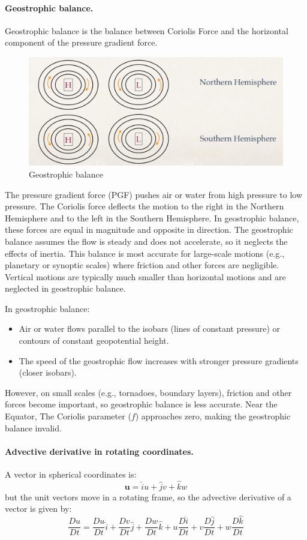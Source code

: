 \paragraph{Geostrophic balance.} Geostrophic balance is the balance between Coriolis Force and the horizontal component of the pressure gradient force.
\begin{figure}
	\centering
	\includegraphics[width=0.5\linewidth]{upload/Screenshot 2024-11-20 195919.png}
	\caption{Geostrophic balance}

\end{figure}
The pressure gradient force (PGF) pushes air or water from high pressure to low pressure. The Coriolis force deflects the motion to the right in the Northern Hemisphere and to the left in the Southern Hemisphere. In geostrophic balance, these forces are equal in magnitude and opposite in direction. The geostrophic balance assumes the flow is steady and does not accelerate, so it neglects the effects of inertia. This balance is most accurate for large-scale motions (e.g., planetary or synoptic scales) where friction and other forces are negligible. Vertical motions are typically much smaller than horizontal motions and are neglected in geostrophic balance.

In geostrophic balance:
\begin{itemize}
	\item Air or water flows parallel to the isobars (lines of constant pressure) or contours of constant geopotential height.
	\item The speed of the geostrophic flow increases with stronger pressure gradients (closer isobars).
\end{itemize}
However, on small scales (e.g., tornadoes, boundary layers), friction and other forces become important, so geostrophic balance is less accurate. Near the Equator, The Coriolis parameter ($f$) approaches zero, making the geostrophic balance invalid.

\paragraph{Advective derivative in rotating coordinates.} A vector in spherical coordinates is:
$$\mathbf{u}=\hat{i}u+\hat{j}v+\hat{k}w$$
but the unit vectors move in a rotating frame, so the advective derivative of a vector is given by:
\begin{equation}\label{eq.adv der in rotating}
	\frac{Du}{Dt}=\frac{Du}{Dt}\hat{i}+\frac{Dv}{Dt}\hat{j}+\frac{Dw}{Dt}\hat{k}+u\frac{D\hat{i}}{Dt}+v\frac{D\hat{j}}{Dt}+w\frac{D\hat{k}}{Dt}
\end{equation}

